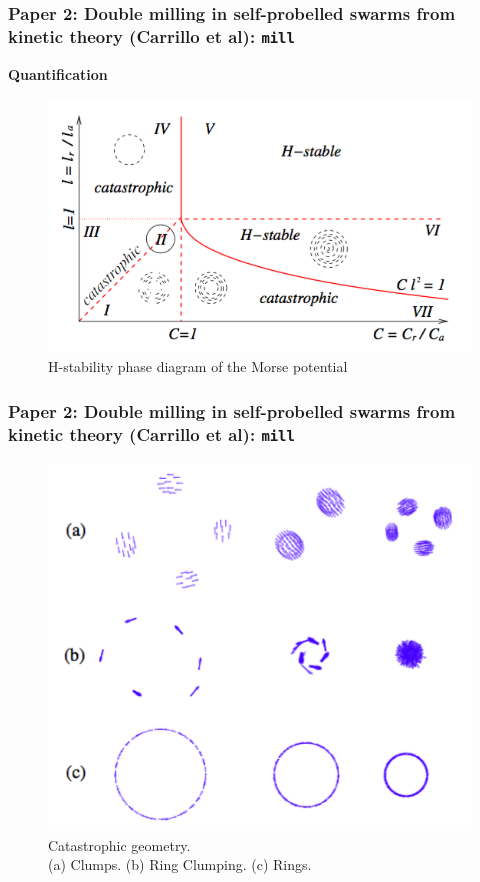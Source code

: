 \documentclass[compress]{beamer}
\begin{document}
\begin{frame}
	\frametitle{Paper 2: Double milling in self-probelled swarms from kinetic theory (Carrillo et al): \texttt{mill}}
	
	\textbf{Quantification}
	
	\begin{figure}[H]
		\includegraphics[width=.9\columnwidth]{./img/H-stabilityPhaseDiagram.png}
		\caption{H-stability phase diagram of the Morse potential}
		\label{hstability}
	\end{figure}
	
\end{frame}


\begin{frame}
	\frametitle{Paper 2: Double milling in self-probelled swarms from kinetic theory (Carrillo et al): \texttt{mill}}
	
%	
	
	\begin{figure}[H]
		\includegraphics[width=.65\columnwidth]{./img/ClumpsRing.png}
		\caption{Catastrophic geometry. \\(a) Clumps. (b) Ring Clumping. (c) Rings.}
		\label{clumps}
	\end{figure}
	
\end{frame}
\end{document}
